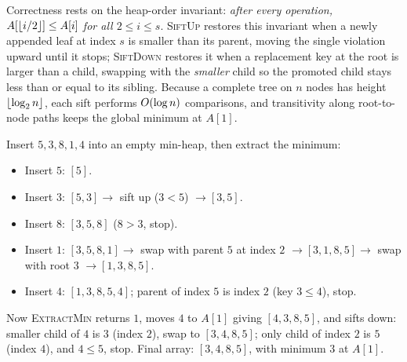 \begin{algorithm}[H]
\caption{Binary-heap sift operations (min-heap, array $A$, size $s$)}
\DontPrintSemicolon
{}
\end{algorithm}

\begin{whybox}
Correctness rests on the heap-order invariant: \emph{after every operation, $A[\lfloor i/2\rfloor] \le A[i]$ for all $2 \le i \le s$}. \textsc{SiftUp} restores this invariant when a newly appended leaf at index $s$ is smaller than its parent, moving the single violation upward until it stops; \textsc{SiftDown} restores it when a replacement key at the root is larger than a child, swapping with the \emph{smaller} child so the promoted child stays less than or equal to its sibling. Because a complete tree on $n$ nodes has height $\lfloor\log_2 n\rfloor$, each sift performs $O(\log n)$ comparisons, and transitivity along root-to-node paths keeps the global minimum at $A[1]$.
\end{whybox}

\begin{labbox}
Insert $5, 3, 8, 1, 4$ into an empty min-heap, then extract the minimum:
\begin{itemize}
\item Insert $5$: $[5]$.
\item Insert $3$: $[5,3] \to$ sift up ($3 < 5$) $\to [3,5]$.
\item Insert $8$: $[3,5,8]$ ($8 > 3$, stop).
\item Insert $1$: $[3,5,8,1] \to$ swap with parent $5$ at index $2$ $\to [3,1,8,5] \to$ swap with root $3$ $\to [1,3,8,5]$.
\item Insert $4$: $[1,3,8,5,4]$; parent of index $5$ is index $2$ (key $3 \le 4$), stop.
\end{itemize}
Now \textsc{ExtractMin} returns $1$, moves $4$ to $A[1]$ giving $[4,3,8,5]$, and sifts down: smaller child of $4$ is $3$ (index $2$), swap to $[3,4,8,5]$; only child of index $2$ is $5$ (index $4$), and $4 \le 5$, stop. Final array: $[3,4,8,5]$, with minimum $3$ at $A[1]$.
\end{labbox}

